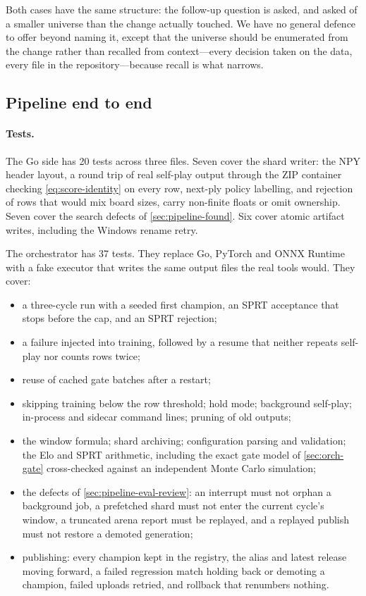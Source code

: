 Both cases have the same structure: the follow-up question is asked, and asked
of a smaller universe than the change actually touched. We have no general
defence to offer beyond naming it, except that the universe should be
enumerated from the change rather than recalled from context---every decision
taken on the data, every file in the repository---because recall is what
narrows.

\subsection{Pipeline end to end}
\label{sec:pipeline-eval}

\paragraph{Tests.}
The Go side has 20 tests across three files. Seven cover the shard writer: the NPY
header layout, a round trip of real self-play output through the ZIP container
checking \cref{eq:score-identity} on every row, next-ply policy labelling, and
rejection of rows that would mix board sizes, carry non-finite floats or omit
ownership. Seven cover the search defects of \cref{sec:pipeline-found}. Six cover
atomic artifact writes, including the Windows rename retry.

The orchestrator has 37 tests. They replace Go, PyTorch and ONNX Runtime with a fake
executor that writes the same output files the real tools would. They cover:
\begin{itemize}
  \item a three-cycle run with a seeded first champion, an SPRT acceptance that stops before
        the cap, and an SPRT rejection;
  \item a failure injected into training, followed by a resume that neither repeats
        self-play nor counts rows twice;
  \item reuse of cached gate batches after a restart;
  \item skipping training below the row threshold; hold mode; background self-play;
        in-process and sidecar command lines; pruning of old outputs;
  \item the window formula; shard archiving; configuration parsing and validation; the
        Elo and SPRT arithmetic, including the exact gate model of \cref{sec:orch-gate}
        cross-checked against an independent Monte Carlo simulation;
  \item the defects of \cref{sec:pipeline-eval-review}: an interrupt must not orphan a
        background job, a prefetched shard must not enter the current cycle's window, a
        truncated arena report must be replayed, and a replayed publish must not restore a
        demoted generation;
  \item publishing: every champion kept in the registry, the alias and latest release
        moving forward, a failed regression match holding back or demoting a champion,
        failed uploads retried, and rollback that renumbers nothing.
\end{itemize}

